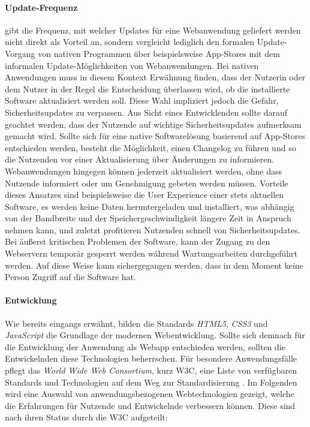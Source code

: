 \documentclass[a4paper]{scrartcl}
\begin{document}
\paragraph{Update-Frequenz}

\textcite[28]{Jobe} gibt die Frequenz, mit welcher Updates für eine Webanwendung geliefert werden nicht direkt als Vorteil an, sondern vergleicht lediglich den formalen Update-Vorgang von nativen Programmen über beispielsweise App-Stores mit dem informalen Update-Möglichkeiten von Webanwendungen. Bei nativen Anwendungen muss in diesem Kontext Erwähnung finden, dass der Nutzerin oder dem Nutzer in der Regel die Entscheidung überlassen wird, ob die installierte Software aktualisiert werden soll. Diese Wahl impliziert jedoch die Gefahr, Sicherheitsupdates zu verpassen. Aus Sicht eines Entwicklenden sollte darauf geachtet werden, dass der Nutzende auf wichtige Sicherheitsupdates aufmerksam gemacht wird. Sollte sich für eine native Softwarelösung basierend auf App-Stores entschieden werden, besteht die Möglichkeit, einen Changelog zu führen und so die Nutzenden vor einer Aktualisierung über Änderungen zu informieren. \\
Webanwendungen hingegen können jederzeit aktualisiert werden, ohne dass Nutzende informiert oder um Genehmigung gebeten werden müssen. Vorteile dieses Ansatzes sind beispielsweise die User Experience einer stets aktuellen Software, es werden keine Daten heruntergeladen und installiert, was abhängig von der Bandbreite und der Speichergeschwindigkeit längere Zeit in Anspruch nehmen kann, und zuletzt profitieren Nutzenden schnell von Sicherheitsupdates. Bei äußerst kritischen Problemen der Software, kann der Zugang zu den Webservern temporär gesperrt werden während Wartungsarbeiten durchgeführt werden. Auf diese Weise kann sichergegangen werden, dass in dem Moment keine Person Zugriff auf die Software hat.

\paragraph{Entwicklung}

Wie bereits eingangs erwähnt, bilden die Standards \textit{HTML5}, \textit{CSS3} und \textit{JavaScript} die Grundlage der modernen Webentwicklung. Sollte sich demnach für die Entwicklung der Anwendung als Webapp entschieden werden, sollten die Entwickelnden diese Technologien beherrschen. Für besondere Anwendungsfälle pflegt das \textit{World Wide Web Consortium}, kurz W3C, eine Liste von verfügbaren Standards und Technologien auf dem Weg zur Standardisierung \autocite{W3C}. Im Folgenden wird eine Auswahl von anwendungsbezogenen Webtechnologien gezeigt, welche die Erfahrungen für Nutzende und Entwickelnde verbessern können. Diese sind nach ihren Status durch die W3C aufgeteilt:
\end{document}

